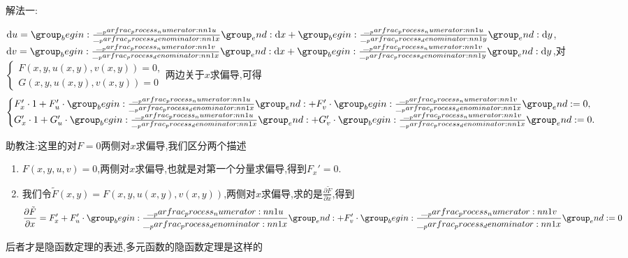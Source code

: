 \begin{solution}
    解法一:

    $\dif u = \parfrac{u}{x} \dif x + \parfrac{u}{y} \dif y$, $\dif v = \parfrac{v}{x} \dif x + \parfrac{v}{y} \dif y$,对$\begin{cases}
        F(x,y,u(x,y),v(x,y)) = 0,\\
        G(x,y,u(x,y),v(x,y)) = 0
    \end{cases}$两边关于$x$求偏导,可得
    $$
    \begin{cases}
        F_x' \cdot 1 + F_u' \cdot \parfrac{u}{x} + F_v' \cdot \parfrac{v}{x} = 0,\\
        G_x' \cdot 1 + G_u' \cdot \parfrac{u}{x} + G_v' \cdot \parfrac{v}{x} = 0.
    \end{cases}
    $$
    \begin{remark}
        助教注:这里的对$F=0$两侧对$x$求偏导,我们区分两个描述
        \begin{enumerate}
            \item $F(x,y,u,v) = 0$,两侧对$x$求偏导,也就是对第一个分量求偏导,得到$F_x' = 0$.
            \item 我们令$\tilde F(x,y) = F(x,y,u(x,y),v(x,y))$,两侧对$x$求偏导,求的是$\frac{\partial \tilde F}{\partial x}$,得到
            $$\frac{\partial \tilde F}{\partial x} = F_x' + F_u' \cdot \parfrac{u}{x} + F_v' \cdot \parfrac{v}{x} = 0$$
        \end{enumerate}
        后者才是隐函数定理的表述,多元函数的隐函数定理是这样的
        \begin{theorem}
            [多元函数隐函数定理]


\end{theorem}
\end{remark}
\end{solution}

